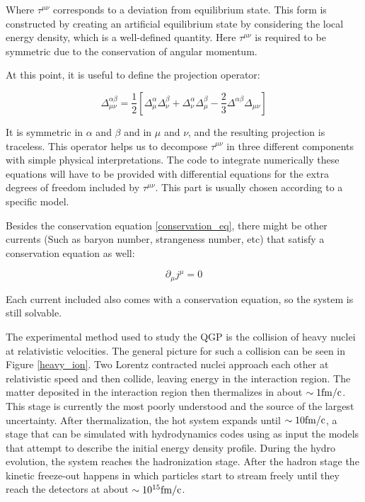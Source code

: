 Where $\tau^{\mu \nu}$ corresponds to a deviation from equilibrium state. This form is constructed by creating an artificial equilibrium state by considering the local energy density, which is a well-defined quantity\cite{romatschke_new_2010}. Here $\tau^{\mu \nu}$ is required to be symmetric due to the conservation of angular momentum.
\par
At this point, it is useful to define the projection operator:

\begin{equation}
\Delta^{\alpha \beta}_{\mu \nu} = \frac{1}{2} \left[ \Delta^{\alpha}_{\mu}\Delta^{\beta}_{\nu} + \Delta^{\alpha}_{\nu}\Delta^{\beta}_{\mu} - \frac{2}{3} \Delta^{\alpha \beta}\Delta_{\mu \nu} \right]
\label{projection}
\end{equation}

It is symmetric in $\alpha$ and $\beta$ and in $\mu$ and $\nu$, and the resulting projection is traceless. This operator helps us to decompose $\tau^{\mu \nu}$ in three different components with simple physical interpretations. The code to integrate numerically these equations will have to be provided with differential equations for the extra degrees of freedom included by $\tau^{\mu \nu}$. This part is usually chosen according to a specific model.
\par 
Besides the conservation equation \eqref{conservation_eq}, there might be other currents (Such as baryon number, strangeness number, etc) that satisfy a conservation equation as well:

\begin{equation}
\partial_{\mu} j^{\mu} = 0
\end{equation}

Each current included also comes with a conservation equation, so the system is still solvable.


The experimental method used to study the QGP is the collision of heavy nuclei at relativistic velocities. The general picture for such a collision can be seen in Figure \ref{heavy_ion}. Two Lorentz contracted nuclei approach each other at relativistic speed and then collide, leaving energy in the interaction region. The matter deposited in the interaction region then thermalizes in about $\sim 1 {\rm fm/c}$. This stage is currently the most poorly understood and the source of the largest uncertainty. After thermalization, the hot system expands until $\sim 10 {\rm fm/c}$, a stage that can be simulated with hydrodynamics codes using as input the models that attempt to describe the initial energy density profile. During the hydro evolution, the system reaches the hadronization stage. After the hadron stage the kinetic freeze-out happens in which particles start to stream freely until they reach the detectors at about $\sim 10^{15} {\rm fm/c}$.

